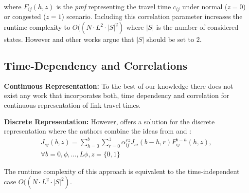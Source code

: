 where $F_{ij}(h,z)$ is the \textit{pmf} representing the travel time $c_{ij}$ under
normal ($z=0$) or congested ($z=1$) scenario. Including this correlation
parameter increases the runtime complexity to $O((N \cdot L^2 \cdot |S|^2)$
where $|S|$ is the number of considered states. However \cite{Nie06} and
other works argue that $|S|$ should be set to 2.

\subsection{Time-Dependency and Correlations}
\label{subsec:timcor}
\vspace{0.2cm}

\textbf{Continuous Representation: } To the best of our knowledge there does not
exist any work that incorporates both, time dependency and correlation for
continuous representation of link travel times.

\textbf{Discrete Representation: } However, \cite{Nie09a} offers a solution
for the discrete representation  where the authors combine the ideas from \cite{Nie09b} and
\cite{Nie06}:
\begin{multline}
\label{eq:pmr4}
	J_{sj}(b,z) = \sum_{h=0}^b \sum_{r=0}^1 \alpha^{rz}_{ij} J_{si}(b-h,r)
	F_{ij}^{b-h}(h,z)  , \\ \forall b = 0, \phi,\ldots, L
	\phi, z = \{0, 1\}
\end{multline}

The runtime complexity of this approach is equivalent to the time-independent
case $O((N \cdot L^2 \cdot |S|^2)$.
